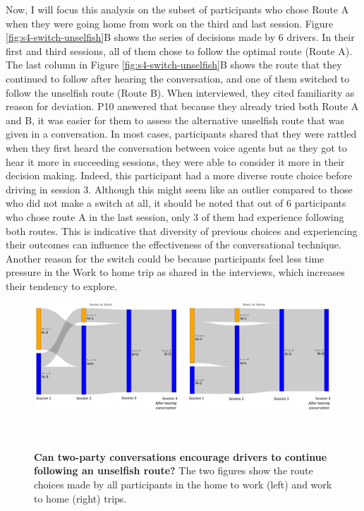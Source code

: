 Now, I will focus this analysis on the subset of participants who chose Route A when they were going home from work on the third and last session. Figure \ref{fig:s4-switch-unselfish}B shows the series of decisions made by 6 drivers. In their first and third sessions, all of them chose to follow the optimal route (Route A). The last column in Figure \ref{fig:s4-switch-unselfish}B shows the route that they continued to follow after hearing the conversation, and one of them switched to follow the unselfish route (Route B). When interviewed, they cited familiarity as reason for deviation. P10 answered that because they already tried both Route A and B, it was easier for them to assess the alternative unselfish route that was given in a conversation. In most cases, participants shared that they were rattled when they first heard the conversation between voice agents but as they got to hear it more in succeeding sessions, they were able to consider it more in their decision making. Indeed, this participant had a more diverse route choice before driving in session 3. Although this might seem like an outlier compared to those who did not make a switch at all, it should be noted that out of 6 participants who chose route A in the last session, only 3 of them had experience following both routes. This is indicative that diversity of previous choices and experiencing their outcomes can influence the effectiveness of the conversational technique. Another reason for the switch could be because participants feel less time pressure in the Work to home trip as shared in the interviews, which increases their tendency to explore. 

\begin{figure}[h]
\centering
  \includegraphics[scale=.45]{figures/s4-continue-follow-results.png}
  \caption{\textbf{Can two-party conversations encourage drivers to continue following an unselfish route?} The two figures show the route choices made by all participants in the home to work (left) and work to home (right) trips.}~\label{fig:s4-continue-follow-results}
\end{figure}

